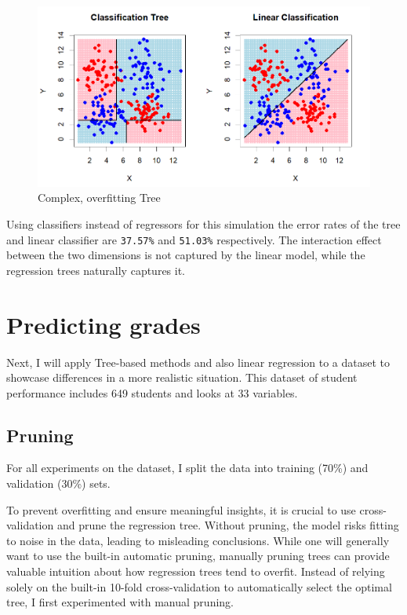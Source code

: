 \documentclass[12pt]{article}
\begin{document}
\begin{figure}
    \centering
    \includegraphics[scale=0.30]{NLD Pred.png}
    \caption{Complex, overfitting Tree}
\end{figure}

Using classifiers instead of regressors for this simulation the error rates of the tree and linear classifier are \texttt{37.57\%} and \texttt{51.03\%} respectively. The interaction effect between the two dimensions is not captured by the linear model, while the regression trees naturally captures it.






\section{Predicting grades}

Next, I will apply Tree-based methods and also linear regression to a dataset to showcase differences in a more realistic situation. This dataset of student performance includes 649 students and looks at 33 variables.






\subsection{Pruning}

For all experiments on the dataset, I split the data into training (70\%) and validation (30\%) sets.

To prevent overfitting and ensure meaningful insights, it is crucial to use cross-validation and prune the regression tree. Without pruning, the model risks fitting to noise in the data, leading to misleading conclusions. While one will generally want to use the built-in automatic pruning, manually pruning trees can provide valuable intuition about how regression trees tend to overfit. Instead of relying solely on the built-in 10-fold cross-validation to automatically select the optimal tree, I first experimented with manual pruning.
\end{document}
